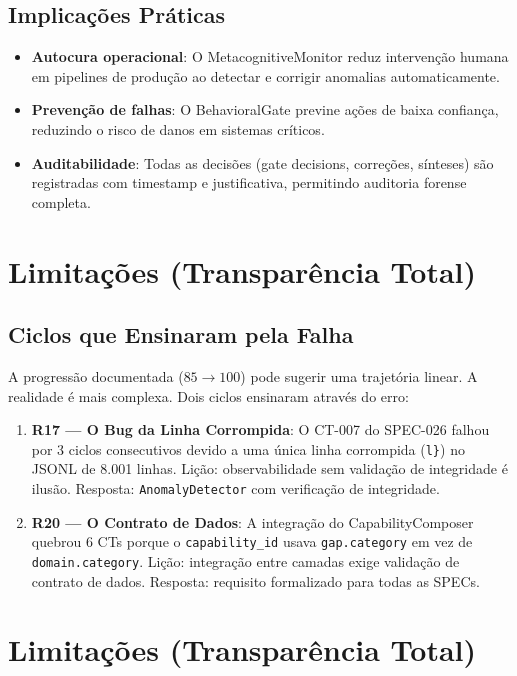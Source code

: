\subsection{Implicações Práticas}

\begin{itemize}
    \item \textbf{Autocura operacional}: O MetacognitiveMonitor reduz intervenção humana em pipelines de produção ao detectar e corrigir anomalias automaticamente.
    \item \textbf{Prevenção de falhas}: O BehavioralGate previne ações de baixa confiança, reduzindo o risco de danos em sistemas críticos.
    \item \textbf{Auditabilidade}: Todas as decisões (gate decisions, correções, sínteses) são registradas com timestamp e justificativa, permitindo auditoria forense completa.
\end{itemize}

\section{Limitações (Transparência Total)}

\subsection{Ciclos que Ensinaram pela Falha}

A progressão documentada ($85 \rightarrow 100$) pode sugerir uma trajetória linear. A realidade é mais complexa. Dois ciclos ensinaram através do erro:

\begin{enumerate}
    \item \textbf{R17 — O Bug da Linha Corrompida}: O CT-007 do SPEC-026 falhou por 3 ciclos consecutivos devido a uma única linha corrompida (\texttt{l\}}) no JSONL de 8.001 linhas. Lição: observabilidade sem validação de integridade é ilusão. Resposta: \texttt{AnomalyDetector} com verificação de integridade.
    \item \textbf{R20 — O Contrato de Dados}: A integração do CapabilityComposer quebrou 6 CTs porque o \texttt{capability\_id} usava \texttt{gap.category} em vez de \texttt{domain.category}. Lição: integração entre camadas exige validação de contrato de dados. Resposta: requisito formalizado para todas as SPECs.
\end{enumerate}

\section{Limitações (Transparência Total)}

